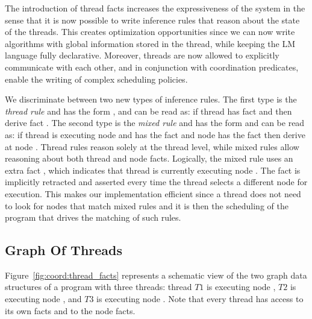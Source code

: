 The introduction of thread facts increases the expressiveness of the system in
the sense that it is now possible to write inference rules that reason about the
state of the threads. This creates optimization opportunities since we can now
write algorithms with global information stored in the thread, while keeping the
LM language fully declarative. Moreover, threads are now allowed to explicitly
communicate with each other, and in conjunction with coordination predicates,
enable the writing of complex scheduling policies.

We discriminate between two new types of inference rules. The first type is the
\emph{thread rule} and has the form , and can be read
as: if thread  has fact  and  then derive fact
. The second type is the \emph{mixed rule} and has the form
 and can be read as: if thread  is executing
node  and has the fact  and node  has the fact
 then derive  at node . Thread rules reason solely
at the thread level, while mixed rules allow reasoning about both thread and
node facts. Logically, the mixed rule uses an extra fact ,
which indicates that thread  is currently executing node . The
 fact is implicitly retracted and asserted every time the thread
selects a different node for execution. This makes our implementation efficient
since a thread does not need to look for nodes that match mixed rules and it is
then the scheduling of the program that drives the matching of such rules.

\subsection{Graph Of Threads}

Figure~\ref{fig:coord:thread_facts} represents a schematic view of the two graph
data structures of a program with three threads: thread $T1$ is executing node
, $T2$ is executing node , and $T3$ is executing node
. Note that every thread has access to its own facts and to the node
facts.

